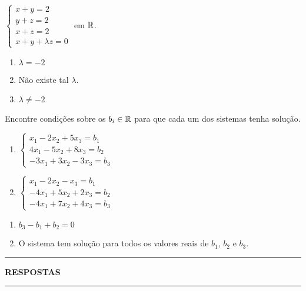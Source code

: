 \documentclass[12pt]{exam}
\begin{document}
\begin{exercicio}\label{sistemasfim}
    $
        \begin{cases}
            x + y = 2\\
            y + z = 2\\
            x + z = 2\\
            x + y + \lambda z = 0
        \end{cases}
    $
    em $\mathbb{R}$.
    \begin{solucao}
        \begin{enumerate}[label={\alph*})]
            \item $\lambda = -2$

            \item Não existe tal $\lambda$.

            \item $\lambda \ne -2$
        \end{enumerate}
    \end{solucao}
\end{exercicio}

\begin{exercicio}
    Encontre condições sobre os $b_i \in \mathbb{R}$ para que cada um dos sistemas tenha solução.
    \begin{enumerate}[label={\alph*})]
        \item $
            \begin{cases}
                x_1 - 2x_2 + 5x_3 = b_1\\
                4x_1 - 5x_2 + 8x_3 = b_2\\
                -3x_1 + 3x_2 - 3x_3 = b_3
            \end{cases}
         $

        \item $
            \begin{cases}
                x_1 - 2x_2 - x_3 = b_1\\
                -4x_1 + 5x_2 + 2x_3 = b_2\\
                -4x_1 + 7x_2 + 4x_3 = b_3
            \end{cases}
        $
    \end{enumerate}
    \begin{solucao}
        \begin{enumerate}[label={\alph*})]
            \item $b_3 - b_1 + b_2 = 0$

            \item O sistema tem solução para todos os valores reais de $b_1$, $b_2$ e $b_3$.
        \end{enumerate}
    \end{solucao}
\end{exercicio}

\newpage
{}
\hrule
\begin{center}
{\large\bf RESPOSTAS}
\end{center}
\hrule

\end{document}
